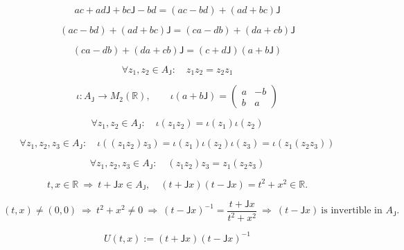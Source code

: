\documentclass[12pt]{article}
\begin{document}
\begin{equation}
ac+ad\mathsf{J}+bc\mathsf{J}-bd
=(ac-bd)+(ad+bc)\mathsf{J}
\end{equation}

\begin{equation}
(ac-bd)+(ad+bc)\mathsf{J}
=(ca-db)+(da+cb)\mathsf{J}
\end{equation}

\begin{equation}
(ca-db)+(da+cb)\mathsf{J}
=(c+d\mathsf{J})(a+b\mathsf{J})
\end{equation}

\begin{equation}
\forall z_1,z_2\in A_{\mathsf{J}}:\quad z_1 z_2=z_2 z_1
\end{equation}

\begin{equation}
\iota:A_{\mathsf{J}}\to M_2(\mathbb{R}),\qquad
\iota(a+b\mathsf{J})=\begin{pmatrix}a&-b\\ b&a\end{pmatrix}
\end{equation}

\begin{equation}
\forall z_1,z_2\in A_{\mathsf{J}}:\quad \iota(z_1 z_2)=\iota(z_1)\iota(z_2)
\end{equation}

\begin{equation}
\forall z_1,z_2,z_3\in A_{\mathsf{J}}:\quad
\iota((z_1 z_2)z_3)=\iota(z_1)\iota(z_2)\iota(z_3)=\iota(z_1(z_2 z_3))
\end{equation}

\begin{equation}
\forall z_1,z_2,z_3\in A_{\mathsf{J}}:\quad (z_1 z_2)z_3=z_1(z_2 z_3)
\end{equation}

\begin{equation}
t,x\in\mathbb{R}\ \Longrightarrow\ t+\mathsf{J}x\in A_{\mathsf{J}},\quad
(t+\mathsf{J}x)(t-\mathsf{J}x)=t^{2}+x^{2}\in\mathbb{R}.
\end{equation}

\begin{equation}
(t,x)\neq(0,0)
\ \Longrightarrow\
t^{2}+x^{2}\neq0
\ \Longrightarrow\
(t-\mathsf{J}x)^{-1}
=\frac{t+\mathsf{J}x}{t^{2}+x^{2}}
\ \Longrightarrow\
(t-\mathsf{J}x)\ \text{is invertible in }A_{\mathsf{J}}.
\end{equation}

\begin{equation}
U(t,x):=(t+\mathsf{J}x)(t-\mathsf{J}x)^{-1}
\end{equation}
\end{document}
